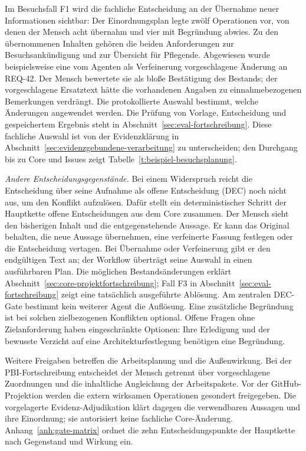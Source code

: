 Im Besuchsfall F1 wird die fachliche Entscheidung an der Übernahme
neuer Informationen sichtbar: Der Einordnungsplan legte zwölf
Operationen vor, von denen der Mensch acht übernahm und vier mit
Begründung abwies. Zu den übernommenen Inhalten gehören die beiden
Anforderungen zur Besuchsankündigung und zur Übersicht für Pflegende.
Abgewiesen wurde beispielsweise eine vom Agenten als Verfeinerung
vorgeschlagene Änderung an REQ-42. Der Mensch bewertete sie als bloße
Bestätigung des Bestands; der vorgeschlagene Ersatztext hätte die
vorhandenen Angaben zu einnahmebezogenen Bemerkungen verdrängt.
Die protokollierte Auswahl bestimmt, welche Änderungen angewendet
werden. Die Prüfung von Vorlage, Entscheidung und gespeichertem
Ergebnis steht in Abschnitt~\ref{sec:eval-fortschreibung}.
 Diese fachliche Auswahl ist von der
Evidenzklärung in Abschnitt~\ref{sec:evidenzgebundene-verarbeitung}
zu unterscheiden; den Durchgang bis zu Core und Issues zeigt
Tabelle~\ref{t:beispiel-besuchsplanung}.

\emph{Andere Entscheidungsgegenstände.} Bei einem Widerspruch reicht
die Entscheidung über seine Aufnahme als offene Entscheidung (DEC)
noch nicht aus, um den Konflikt aufzulösen. Dafür stellt ein deterministischer
Schritt der Hauptkette offene Entscheidungen aus dem Core zusammen.
Der Mensch sieht den bisherigen Inhalt und die entgegenstehende
Aussage. Er kann das Original behalten, die neue Aussage übernehmen,
eine verfeinerte Fassung festlegen oder die Entscheidung vertagen.
Bei Übernahme oder Verfeinerung gibt er den endgültigen Text an;
der Workflow überträgt seine Auswahl in einen ausführbaren Plan.
Die möglichen Bestandsänderungen erklärt
Abschnitt~\ref{sec:core-projektfortschreibung}; Fall F3 in
Abschnitt~\ref{sec:eval-fortschreibung} zeigt eine tatsächlich
ausgeführte Ablösung. Am zentralen DEC-Gate bestimmt kein weiterer
Agent die Auflösung. Eine zusätzliche Begründung ist bei solchen
zielbezogenen Konflikten optional. Offene Fragen ohne Zielanforderung
haben eingeschränkte Optionen: Ihre Erledigung und der bewusste
Verzicht auf eine Architekturfestlegung benötigen eine Begründung.

Weitere Freigaben betreffen die Arbeitsplanung und die Außenwirkung.
Bei der PBI-Fortschreibung entscheidet der Mensch getrennt über
vorgeschlagene Zuordnungen und die inhaltliche Angleichung der
Arbeitspakete. Vor der GitHub-Projektion werden die extern wirksamen
Operationen gesondert freigegeben. Die vorgelagerte
Evidenz-Adjudikation klärt dagegen die verwendbaren Aussagen und
ihre Einordnung; sie autorisiert keine fachliche Core-Änderung.
Anhang~\ref{anh:gate-matrix} ordnet die zehn Entscheidungspunkte
der Hauptkette nach Gegenstand und Wirkung ein.

